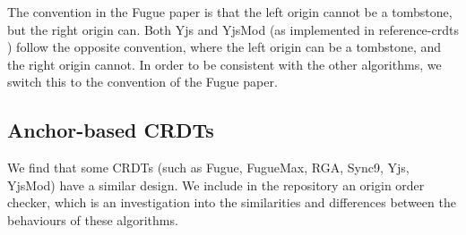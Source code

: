 \documentclass[sigplan,10pt,review,anonymous]{acmart}
\begin{document}
The convention in the Fugue paper is that the left origin cannot be a tombstone, but the right origin can. Both Yjs and YjsMod (as implemented in reference-crdts \cite{Gentle2021}) follow the opposite convention, where the left origin can be a tombstone, and the right origin cannot. In order to be consistent with the other algorithms, we switch this to the convention of the Fugue paper.

\subsection{Anchor-based CRDTs}

We find that some CRDTs (such as Fugue, FugueMax, RGA, Sync9, Yjs, YjsMod) have a similar design. We include in the repository an origin order checker, which is an investigation into the similarities and differences between the behaviours of these algorithms.
\end{document}
